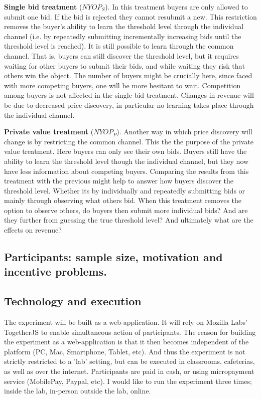 \documentclass[a4paper,12pt]{article}
\begin{document}
	{\bf Single bid treatment} ($NYOP_S$).
	In this treatment buyers are only allowed to submit one bid. If the bid is rejected they cannot resubmit a new. This restriction removes the buyer's ability to learn the threshold level through the individual channel (i.e. by repeatedly submitting incrementally increasing bids until the threshold level is reached). It is still possible to learn through the common channel. That is, buyers can still discover the threshold level, but it requires waiting for other buyers to submit their bids, and while waiting they risk that others win the object. The number of buyers might be crucially here, since faced with more competing buyers, one will be more hesitant to wait. Competition among buyers is not affected in the single bid treatment. Changes in revenue will be due to decreased price discovery, in particular no learning takes place through the individual channel.

	{\bf Private value treatment} ($NYOP_P$).
	Another way in which price discovery will change is by restricting the common channel. This the the purpose of the private value treatment. Here buyers can only see their own bids. Buyers still have the ability to learn the threshold level though the individual channel, but they now have less information about competing buyers. Comparing the results from this treatment with the previous might help to answer how buyers discover the threshold level. Whether its by individually and repeatedly submitting bids or mainly through observing what others bid. When this treatment removes the option to observe others, do buyers then submit more individual bids? And are they further from guessing the true threshold level? And ultimately what are the effects on revenue? 

	\subsection{Participants: sample size, motivation and incentive problems.}


	\subsection{Technology and execution}
	The experiment will be built as a web-application. It will rely on Mozilla Labs' TogetherJS to enable simultaneous action of participants. The reason for building the experiment as a web-application is that it then becomes independent of the platform (PC, Mac, Smartphone, Tablet, etc). And thus the experiment is not strictly restricted to a 'lab' setting, but can be executed in classrooms, cafeterias, as well as over the internet. Participants are paid in cash, or using micropayment service (MobilePay, Paypal, etc). I would like to run the experiment three times; inside the lab, in-person outside the lab, online.
\end{document}
